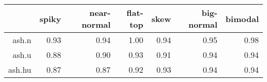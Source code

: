 \begin{tabular}{rrrrrrr}
  \toprule  & spiky & near-normal & flat-top & skew & big-normal & bimodal \\ 
  \midrule ash.n & 0.93 & 0.94 & 1.00 & 0.94 & 0.95 & 0.98 \\ 
  ash.u & 0.88 & 0.90 & 0.93 & 0.91 & 0.94 & 0.94 \\ 
  ash.hu & 0.87 & 0.87 & 0.92 & 0.93 & 0.94 & 0.94 \\ 
   \bottomrule \end{tabular}

